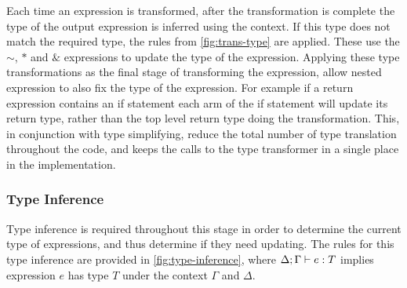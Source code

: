 \documentclass[ oneside,%
                    author={James Elgar},
                    degree={MEng},
                     title={Bidirectional transformer between functional and \\ object-oriented programming in Rust},
                  subtitle={}]{dissertation}
\begin{document}
Each time an expression is transformed, after the transformation is complete the type of the output expression is inferred using the context. If this type does not match the required type, the rules from \autoref{fig:trans-type} are applied. These use the $\sim$, $*$ and $\&$ expressions to update the type of the expression. Applying these type transformations as the final stage of transforming the expression, allow nested expression to also fix the type of the expression. For example if a return expression contains an if statement each arm of the if statement will update its return type, rather than the top level return type doing the transformation. This, in conjunction with type simplifying, reduce the total number of type translation throughout the code, and keeps the calls to the type transformer in a single place in the implementation.


\subsubsection{Type Inference}

Type inference is required throughout this stage in order to determine the current type of expressions, and thus determine if they need updating. The rules for this type inference are provided in \autoref{fig:type-inference}, where $\Delta; \Gamma  \vdash e : T$ implies expression $e$ has type $T$ under the context $\Gamma$ and $\Delta$.
\end{document}
